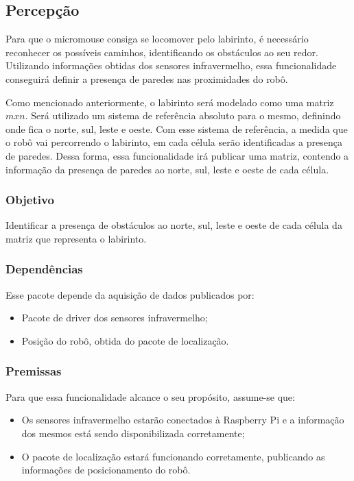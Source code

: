 \subsection{Percepção}
\label{ssec:funcionalidade_percepcao} 
Para que o micromouse consiga se locomover pelo labirinto, é necessário reconhecer os possíveis caminhos, identificando os obstáculos ao seu redor. Utilizando informações obtidas dos sensores infravermelho, essa funcionalidade conseguirá definir a presença de paredes nas proximidades do robô.
 
Como mencionado anteriormente, o labirinto será modelado como uma matriz $mxn$. Será utilizado um sistema de referência absoluto para o mesmo, definindo onde fica o norte, sul, leste e oeste. Com esse sistema de referência, a medida que o robô vai percorrendo o labirinto, em cada célula serão identificadas a presença de paredes. Dessa forma, essa funcionalidade irá publicar uma matriz, contendo a informação da presença de paredes ao norte, sul, leste e oeste de cada célula.

\subsubsection{Objetivo}
Identificar a presença de obstáculos ao norte, sul, leste e oeste de cada célula da matriz que representa o labirinto.

\subsubsection{Dependências}
Esse pacote depende da aquisição de dados publicados por:
\begin{itemize}
	\item Pacote de driver dos sensores infravermelho;
	\item Posição do robô, obtida do pacote de localização. 
\end{itemize}

\subsubsection{Premissas}
Para que essa funcionalidade alcance o seu propósito, assume-se que:
\begin{itemize}
	\item Os sensores infravermelho estarão conectados à Raspberry Pi e a informação dos mesmos está sendo disponibilizada corretamente;
	\item O pacote de localização estará funcionando corretamente, publicando as informações de posicionamento do robô.
\end{itemize}

